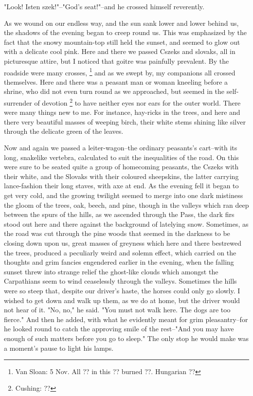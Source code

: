 "Look! Isten szek!"--"God's seat!"--and he crossed himself reverently. 

As we wound on our endless way, and the sun sank lower and lower behind us, the shadows of the evening began to creep round us. This was emphasized by the fact that the snowy mountain-top still held the sunset, and seemed to glow out with a delicate cool pink. Here and there we passed Cszeks and slovaks, all in picturesque attire, but I noticed that goitre was painfully prevalent. By the roadside were many crosses,
\footnote{Van Sloan: 5 Nov. All ?? in this ?? burned ??. Hungarian ??}
and as we swept by, my companions all crossed themselves. Here and there was a peasant man or woman kneeling before a shrine, who did not even turn round as we approached, but seemed in the self-surrender of devotion
\footnote{Cushing: ??}
to have neither eyes nor ears for the outer world. There were many things new to me. For instance, hay-ricks in the trees, and here and there very beautiful masses of weeping birch, their white stems shining like silver through the delicate green of the leaves. 

Now and again we passed a leiter-wagon--the ordinary peasants's cart--with its long, snakelike vertebra, calculated to suit the inequalities of the road. On this were sure to be seated quite a group of homecoming peasants, the Cszeks with their white, and the Slovaks with their coloured sheepskins, the latter carrying lance-fashion their long staves, with axe at end. As the evening fell it began to get very cold, and the growing twilight seemed to merge into one dark mistiness the gloom of the trees, oak, beech, and pine, though in the valleys which ran deep between the spurs of the hills, as we ascended through the Pass, the dark firs stood out here and there against the background of latelying snow. Sometimes, as the road was cut through the pine woods that seemed in the darkness to be closing down upon us, great masses of greyness which here and there bestrewed the trees, produced a peculiarly weird and solemn effect, which carried on the thoughts and grim fancies engendered earlier in the evening, when the falling sunset threw into strange relief the ghost-like clouds which amongst the Carpathians seem to wind ceaselessly through the valleys. Sometimes the hills were so steep that, despite our driver's haste, the horses could only go slowly. I wished to get down and walk up them, as we do at home, but the driver would not hear of it. "No, no," he said. "You must not walk here. The dogs are too fierce." And then he added, with what he evidently meant for grim pleasantry--for he looked round to catch the approving smile of the rest--"And you may have enough of such matters before you go to sleep." The only stop he would make was a moment's pause to light his lamps. 

